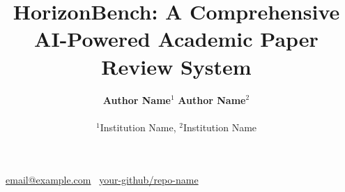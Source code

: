 \documentclass{article}
\title{HorizonBench: A Comprehensive AI-Powered Academic Paper Review System}
\author{%
  \textbf{Author Name}${}^{1}$ \quad
  \textbf{Author Name}${}^{2}$ \\
  \\
  ${}^{1}$Institution Name, ${}^{2}$Institution Name \\
}
\begin{document}
\newcommand{\contactline}[2]{%
  \vspace{-1.8em}
  \begin{center}
    \faEnvelope~\href{mailto:#1}{#1}\quad
    \faGithub~\href{https://github.com/#2}{#2}
  \end{center}
  \vspace{+0.2em}
}

\maketitle
\contactline{email@example.com}{your-github/repo-name}


\begin{abstract}
\end{abstract}
















\newpage
\appendix

\end{document}

